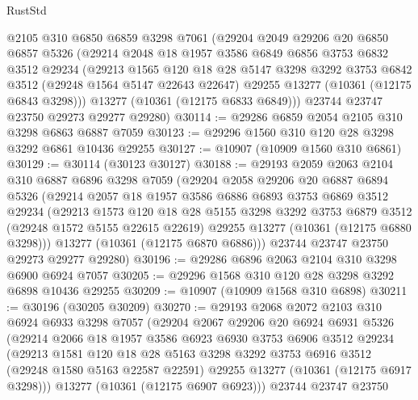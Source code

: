 \begin{lexlean}{RustStd}
\begin{coremodule}
    @2105
    @310
    @6850
    @6859
    @3298
    @7061
    (@29204
      @2049
      @29206
      @20
      @6850
      @6857
      @5326
      (@29214
        @2048
        @18
        @1957
        @3586
        @6849
        @6856
        @3753
        @6832
        @3512
        @29234
        (@29213
          @1565
          @120
          @18
          @28
          @5147
          @3298
          @3292
          @3753
          @6842
          @3512
          (@29248 @1564 @5147 @22643 @22647)
          @29255
          @13277
          (@10361 (@12175 @6843 @3298)))
        @13277
        (@10361 (@12175 @6833 @6849)))
      @23744
      @23747
      @23750
      @29273
      @29277
      @29280)
@30114 := @29286 @6859 @2054 @2105 @310 @3298 @6863 @6887 @7059
@30123 := @29296 @1560 @310 @120 @28 @3298 @3292 @6861 @10436 @29255
@30127 := @10907 (@10909 @1560 @310 @6861)
@30129 := @30114 (@30123 @30127)
@30188 := @29193
    @2059
    @2063
    @2104
    @310
    @6887
    @6896
    @3298
    @7059
    (@29204
      @2058
      @29206
      @20
      @6887
      @6894
      @5326
      (@29214
        @2057
        @18
        @1957
        @3586
        @6886
        @6893
        @3753
        @6869
        @3512
        @29234
        (@29213
          @1573
          @120
          @18
          @28
          @5155
          @3298
          @3292
          @3753
          @6879
          @3512
          (@29248 @1572 @5155 @22615 @22619)
          @29255
          @13277
          (@10361 (@12175 @6880 @3298)))
        @13277
        (@10361 (@12175 @6870 @6886)))
      @23744
      @23747
      @23750
      @29273
      @29277
      @29280)
@30196 := @29286 @6896 @2063 @2104 @310 @3298 @6900 @6924 @7057
@30205 := @29296 @1568 @310 @120 @28 @3298 @3292 @6898 @10436 @29255
@30209 := @10907 (@10909 @1568 @310 @6898)
@30211 := @30196 (@30205 @30209)
@30270 := @29193
    @2068
    @2072
    @2103
    @310
    @6924
    @6933
    @3298
    @7057
    (@29204
      @2067
      @29206
      @20
      @6924
      @6931
      @5326
      (@29214
        @2066
        @18
        @1957
        @3586
        @6923
        @6930
        @3753
        @6906
        @3512
        @29234
        (@29213
          @1581
          @120
          @18
          @28
          @5163
          @3298
          @3292
          @3753
          @6916
          @3512
          (@29248 @1580 @5163 @22587 @22591)
          @29255
          @13277
          (@10361 (@12175 @6917 @3298)))
        @13277
        (@10361 (@12175 @6907 @6923)))
      @23744
      @23747
      @23750

\end{coremodule}
\end{lexlean}
